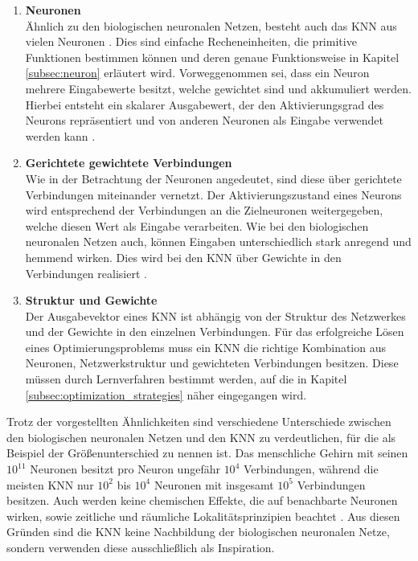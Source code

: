 \begin{enumerate}
	\item \textbf{Neuronen}\\
	Ähnlich zu den biologischen neuronalen Netzen, besteht auch das \ac{KNN} aus vielen Neuronen \cite{zell2003simulation}. Dies sind einfache Recheneinheiten, die primitive Funktionen bestimmen können \cite{scherer2013neuronale} und deren genaue Funktionsweise in Kapitel \ref{subsec:neuron} erläutert wird. Vorweggenommen sei, dass ein Neuron mehrere Eingabewerte besitzt, welche gewichtet sind und akkumuliert werden. Hierbei entsteht ein skalarer Ausgabewert, der den Aktivierungsgrad des Neurons repräsentiert und von anderen Neuronen als Eingabe verwendet werden kann \cite{kriesel2008kleiner}. 
	 
	\item \textbf{Gerichtete gewichtete Verbindungen}\\
	Wie in der Betrachtung der Neuronen angedeutet, sind diese über gerichtete Verbindungen miteinander vernetzt. Der Aktivierungszustand eines Neurons wird entsprechend der Verbindungen an die Zielneuronen weitergegeben, welche diesen Wert als Eingabe verarbeiten. Wie bei den biologischen neuronalen Netzen auch, können Eingaben unterschiedlich stark anregend und hemmend wirken. Dies wird bei den \ac{KNN} über Gewichte in den Verbindungen realisiert \cite{zell2003simulation}.
	
	\item \textbf{Struktur und Gewichte}\\
	Der Ausgabevektor eines \ac{KNN} ist abhängig von der Struktur des Netzwerkes und der Gewichte in den einzelnen Verbindungen.
	Für das erfolgreiche Lösen eines Optimierungsproblems muss ein \ac{KNN} die richtige Kombination aus Neuronen, Netzwerkstruktur und gewichteten Verbindungen besitzen. Diese müssen durch Lernverfahren bestimmt werden, auf die in Kapitel \ref{subsec:optimization_strategies} näher eingegangen wird.
\end{enumerate}
Trotz der vorgestellten Ähnlichkeiten sind verschiedene Unterschiede zwischen den biologischen neuronalen Netzen und den \ac{KNN} zu verdeutlichen, für die als Beispiel der Größenunterschied zu nennen ist. Das menschliche Gehirn mit seinen ${10}^{11}$ Neuronen besitzt pro Neuron ungefähr $10^4$ Verbindungen, während die meisten \ac{KNN} nur ${10}^{2}$ bis ${10}^{4}$ Neuronen mit insgesamt ${10}^{5}$ Verbindungen besitzen. Auch werden keine chemischen Effekte, die auf benachbarte Neuronen wirken, sowie zeitliche und räumliche Lokalitätsprinzipien beachtet \cite{zell2003simulation}. Aus diesen Gründen sind die \ac{KNN} keine Nachbildung der biologischen neuronalen Netze, sondern verwenden diese ausschließlich als Inspiration. 

